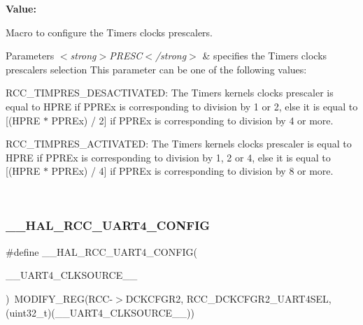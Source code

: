 {\bfseries Value\+:}
\begin{DoxyCode}{0}

\end{DoxyCode}


Macro to configure the Timers clocks prescalers. 


\begin{DoxyParams}{Parameters}
{\em $<$strong$>$\+P\+R\+E\+S\+C$<$/strong$>$} & specifies the Timers clocks prescalers selection This parameter can be one of the following values\+: \begin{DoxyItemize}
\item R\+C\+C\+\_\+\+T\+I\+M\+P\+R\+E\+S\+\_\+\+D\+E\+S\+A\+C\+T\+I\+V\+A\+T\+ED\+: The Timers kernels clocks prescaler is equal to H\+P\+RE if P\+P\+R\+Ex is corresponding to division by 1 or 2, else it is equal to \mbox{[}(H\+P\+RE $\ast$ P\+P\+R\+Ex) / 2\mbox{]} if P\+P\+R\+Ex is corresponding to division by 4 or more. \item R\+C\+C\+\_\+\+T\+I\+M\+P\+R\+E\+S\+\_\+\+A\+C\+T\+I\+V\+A\+T\+ED\+: The Timers kernels clocks prescaler is equal to H\+P\+RE if P\+P\+R\+Ex is corresponding to division by 1, 2 or 4, else it is equal to \mbox{[}(H\+P\+RE $\ast$ P\+P\+R\+Ex) / 4\mbox{]} if P\+P\+R\+Ex is corresponding to division by 8 or more. \end{DoxyItemize}
\\
\hline
\end{DoxyParams}
\mbox{\label{group___r_c_c_ex___exported___macros_gab9ffca069f4dfc371811e084170998c5}} 
\subsubsection{\texorpdfstring{\_\_HAL\_RCC\_UART4\_CONFIG}{\_\_HAL\_RCC\_UART4\_CONFIG}}
{\footnotesize\ttfamily \#define \+\_\+\+\_\+\+H\+A\+L\+\_\+\+R\+C\+C\+\_\+\+U\+A\+R\+T4\+\_\+\+C\+O\+N\+F\+IG(\begin{DoxyParamCaption}\item[{}]{\+\_\+\+\_\+\+U\+A\+R\+T4\+\_\+\+C\+L\+K\+S\+O\+U\+R\+C\+E\+\_\+\+\_\+ }\end{DoxyParamCaption})~M\+O\+D\+I\+F\+Y\+\_\+\+R\+EG(R\+CC-\/$>$D\+C\+K\+C\+F\+G\+R2, R\+C\+C\+\_\+\+D\+C\+K\+C\+F\+G\+R2\+\_\+\+U\+A\+R\+T4\+S\+EL, (uint32\+\_\+t)(\+\_\+\+\_\+\+U\+A\+R\+T4\+\_\+\+C\+L\+K\+S\+O\+U\+R\+C\+E\+\_\+\+\_\+))}



